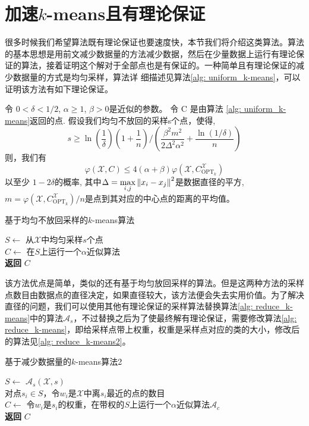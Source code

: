 \section{加速\texorpdfstring{$k$}{k}-means且有理论保证}
很多时候我们希望算法既有理论保证也要速度快，本节我们将介绍这类算法。算法的基本思想是用前文减少数据量的方法减少数据，然后在少量数据上运行有理论保证的算法，接着证明这个解对于全部点也是有保证的。一种简单且有理论保证的减少数据量的方式是均匀采样，算法详
细描述见算法\ref{alg: uniform_k-means}，可以证明该方法有如下理论保证。
\begin{theorem}[均匀不放回采样的解的质量]
    \label{theo: uniform_k-means}
    令 $0 < \delta <1/2$, $\alpha \geq 1$, $\beta >0$是近似的参数。 令 C 是由算法 \ref{alg: uniform_k-means}返回的点. 假设我们均匀不放回的采样s个点，使得,
    \begin{equation}
    s \geq \ln(\frac{1}{\delta})(1+\frac{1}{n})/(\frac{\beta^2 m^2}{2\Delta^2 \alpha^2}+\frac{\ln(1/\delta)}{n})
    \end{equation}
    则，我们有
    \begin{equation}
    \varphi(\mathcal{X},C) \leq 4(\alpha + \beta)\varphi(\mathcal{X},C_{\text{OPT}_k}^{\mathcal{X}})
    \end{equation}
    以至少 $1-2\delta$的概率, 其中$\Delta = \max\limits_{i,j}\left\lVert x_i - x_j\right\rVert^2$是数据直径的平方, $m = \varphi(\mathcal{X},C_{\text{OPT}_k}^{\mathcal{X}})/n$是点到其对应的中心点的距离的平均值。
\end{theorem}
\begin{algorithm}
    \caption{基于均匀不放回采样的$k$-means算法}\label{alg: uniform_k-means}
    $S \gets$ 从$\mathcal{X}$中均匀采样$s$个点\\
    $C \gets$ 在$S$上运行一个$\alpha$近似算法\\
    \textbf{返回} $C$
\end{algorithm}
该方法优点是简单，类似的还有基于均匀放回采样的算法。但是这两种方法的采样点数目由数据点的直径决定，如果直径较大，该方法便会失去实用价值。为了解决直径的问题，我们可以使用其他有理论保证的采样算法替换算法\ref{alg: reduce_k-means}中的算法$\mathcal{A}_s$，不过替换之后为了使最终解有理论保证，需要修改算法\ref{alg: reduce_k-means}，即给采样点带上权重，权重是采样点对应的类的大小，修改后的算法见\ref{alg: reduce_k-means2}。
\begin{algorithm}
    \caption{基于减少数据量的$k$-means算法2}\label{alg: reduce_k-means2}
    $S \gets$ $\mathcal{A}_s(\mathcal{X},s)$ \\
    对点$s_i \in S$，令$w_i$是$\mathcal{X}$中离$s_i$最近的点的数目 \\
    $C \gets$ 令$w_i$是$s_i$的权重，在带权的$S$上运行一个$\alpha$近似算法$\mathcal{A}_c$ \\
    \textbf{返回} $C$
\end{algorithm}
